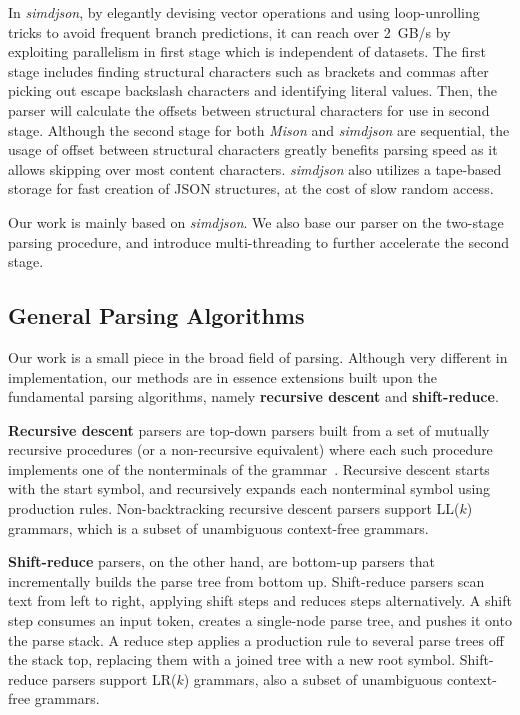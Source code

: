 \documentclass[11pt]{article}
\begin{document}
In \textit{simdjson}, by elegantly devising vector operations and using loop-unrolling tricks to avoid frequent branch predictions, it can reach over \SI{2}{GB/s} by exploiting parallelism in first stage which is independent of datasets. The first stage includes finding structural characters such as brackets and commas after picking out escape backslash characters and identifying literal values. Then, the parser will calculate the offsets between structural characters for use in second stage. Although the second stage for both \textit{Mison} and \textit{simdjson} are sequential, the usage of offset between structural characters greatly benefits parsing speed as it allows skipping over most content characters. \textit{simdjson} also utilizes a tape-based storage for fast creation of JSON structures, at the cost of slow random access.

Our work is mainly based on \textit{simdjson}. We also base our parser on the two-stage parsing procedure, and introduce multi-threading to further accelerate the second stage.

\subsection{General Parsing Algorithms}
\label{sec:parse-algo}

Our work is a small piece in the broad field of parsing. Although very different in implementation, our methods are in essence extensions built upon the fundamental parsing algorithms, namely \textbf{recursive descent} and  \textbf{shift-reduce}.

\textbf{Recursive descent} parsers are top-down parsers built from a set of mutually recursive procedures (or a non-recursive equivalent) where each such procedure implements one of the nonterminals of the grammar~\cite{burge1975recursive}. Recursive descent starts with the start symbol, and recursively expands each nonterminal symbol using production rules. Non-backtracking recursive descent parsers support LL($k$) grammars, which is a subset of unambiguous context-free grammars.

\textbf{Shift-reduce} parsers, on the other hand, are bottom-up parsers that incrementally builds the parse tree from bottom up. Shift-reduce parsers scan text from left to right, applying shift steps and reduces steps alternatively. A shift step consumes an input token, creates a single-node parse tree, and pushes it onto the parse stack. A reduce step applies a production rule to several parse trees off the stack top, replacing them with a joined tree with a new root symbol. Shift-reduce parsers support LR($k$) grammars, also a subset of unambiguous context-free grammars.
\end{document}
